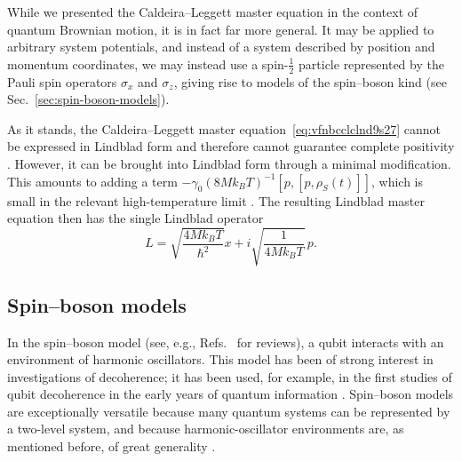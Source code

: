 \documentclass[3p,sort&compress]{elsarticle}
\newcommand{\I}{\ensuremath{i}}
\newcommand{\op}[1]{#1}
\begin{document}
While we presented the Caldeira--Leggett master equation in the context of quantum Brownian motion, it is in fact far more general.  It may be applied to arbitrary system potentials, and instead of a system described by position and momentum coordinates, we may instead use a spin-$\frac{1}{2}$ particle represented by the Pauli spin operators $\op{\sigma}_x$ and $\op{\sigma}_z$, giving rise to models of the spin--boson kind (see Sec.~\ref{sec:spin-boson-models}). 

As it stands, the Caldeira--Leggett master equation~\eqref{eq:vfnbcclclnd9s27} cannot be expressed in Lindblad form and therefore cannot guarantee complete positivity \cite{Breuer:2002:oq}. However, it can be brought into Lindblad form through a minimal modification. This amounts to adding a term $-\gamma_0(8Mk_B T)^{-1} [p,[p, \op{\rho}_S(t)]]$, which is small in the relevant high-temperature limit \cite{Breuer:2002:oq}. The resulting Lindblad master equation then has the single Lindblad operator 
%
\begin{equation}\label{eq:dkvnkl1}
\op{L} = \sqrt{\frac{4Mk_B T}{\hbar^2}}\op{x} + \I \sqrt{\frac{1}{4Mk_B T}} \,\op{p}.
\end{equation}
%


\subsection{\label{sec:spin-boson-models}Spin--boson models}

In the spin--boson model (see, e.g., Refs.~\cite{Leggett:1987:pm,Breuer:2002:oq,Schlosshauer:2007:un} for reviews), a qubit interacts with an environment of harmonic oscillators. This model has been of strong interest in investigations of decoherence; it has been used, for example, in the first studies of qubit decoherence in the early years of quantum information \cite{Unruh:1995:uy,Palma:1996:yy}. Spin--boson models are exceptionally versatile because many quantum systems can be represented by a two-level system, and because harmonic-oscillator environments are, as mentioned before, of great generality \cite{Feynman:1963:jj,Caldeira:1983:gv}. 
\end{document}

